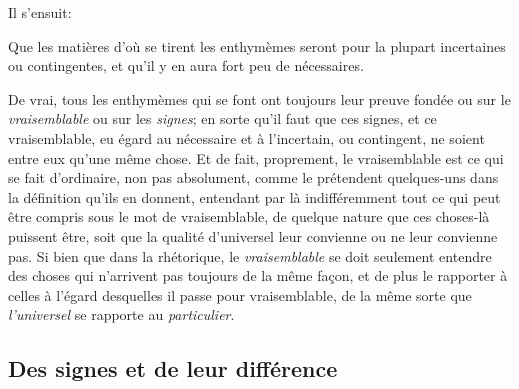 Il s'ensuit:

\begin{emphpar}
      Que les matières d'où se tirent les enthymèmes seront pour la plupart incertaines ou contingentes, et qu'il y en aura fort peu de nécessaires.
\end{emphpar}

De vrai, tous les enthymèmes qui se font ont toujours leur preuve fondée ou sur le \emph{vraisemblable} ou sur les \emph{signes}; en sorte qu'il faut que
ces signes, et ce vraisemblable, eu égard au nécessaire et à l'incertain, ou contingent, ne soient entre eux qu'une même chose. Et de fait, proprement,
le vraisemblable est ce qui se fait d'ordinaire, non %
pas absolument, comme le prétendent quelques-uns dans la définition qu'ils en donnent, entendant par là indifféremment tout ce qui peut être compris sous
le mot de vraisemblable, de quelque nature que ces choses-là puissent être, soit que la qualité d'universel leur convienne ou ne leur convienne pas. Si
bien que dans la rhétorique, le \emph{vraisemblable} se doit seulement entendre des choses qui n'arrivent pas toujours de la même façon, et de plus le rapporter
à celles à l'égard desquelles il passe pour vraisemblable, de la même sorte que \emph{l'universel} se rapporte au \emph{particulier}.

\subsection{Des signes et de leur différence}

